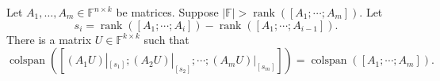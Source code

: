\documentclass[11pt]{article}
\newcommand{\FF}{\mathbb{F}}
\DeclareMathOperator{\rank}{rank} \DeclareMathOperator{\col}{colspan}
\begin{document}
\begin{lemma}\label{lem:max-rank-induction}
    Let $A_1, \ldots, A_m \in \FF^{n \times k}$ be matrices. Suppose $|\FF| > \rank([A_1; \cdots; A_m])$. Let 
    \[
    s_i = \rank([A_1; \cdots ; A_{i}]) - \rank([A_1; \cdots ; A_{i-1}]).
    \]
    There is a matrix $U \in \FF^{k \times k}$ such that
\begin{equation}\label{eq:cspan2}
    \col([(A_1 U)|_{[s_1]} ; (A_2 U)|_{[s_2]} ; \cdots ; (A_m U)|_{[s_m]}]) = \col([A_1; \cdots ; A_m]).
\end{equation}
\end{lemma}
\end{document}
